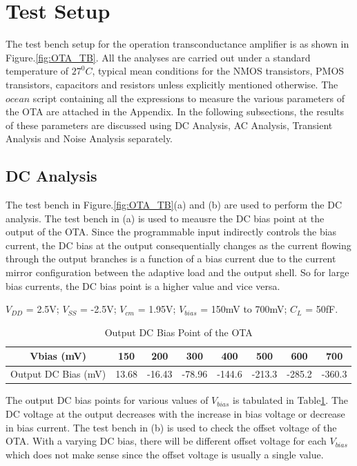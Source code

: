 \section{Test Setup}
The test bench setup for the operation transconductance amplifier is as shown in Figure.\ref{fig:OTA_TB}. All the analyses are carried out under a standard temperature of $27^0C$, typical mean conditions for the NMOS transistors, PMOS transistors, capacitors and resistors unless explicitly mentioned otherwise. The $ocean$ script containing all the expressions to measure the various parameters of the OTA are attached in the Appendix. In the following subsections, the results of these parameters are discussed using DC Analysis, AC Analysis, Transient Analysis and Noise Analysis separately.

\subsection{DC Analysis}
The test bench in Figure.\ref{fig:OTA_TB}(a) and (b) are used to perform the DC analysis. The test bench in (a) is used to meausre the DC bias point at the output of the OTA. Since the programmable input indirectly controls the bias current, the DC bias at the output consequentially changes as the current flowing through the output branches is a function of a bias current due to the current mirror configuration between the adaptive load and the output shell. So for large bias currents, the DC bias point is a higher value and vice versa.
 
$V_{DD}$ = 2.5V; $V_{SS}$ = -2.5V; $V_{cm}$ = 1.95V; $V_{bias}$ = 150mV to 700mV;   $C_{L}$ = 50fF.

\begin{table} [H]
\centering
\begin{tabular}{@{}cccccccc@{}}
\toprule
Vbias (mV)					& 150		& 200			& 300			& 400			& 500			& 600			& 700 \\ \midrule
Output DC Bias (mV)			& 13.68		& -16.43		& -78.96		& -144.6		& -213.3		& -285.2		& -360.3 \\
\bottomrule
\end{tabular}
\caption{Output DC Bias Point of the OTA}
\label{tab:OTA_DC_Bias}
\end{table}

The output DC bias points for various values of $V_{bias}$ is tabulated in Table\ref{tab:OTA_DC_Bias}. The DC voltage at the output decreases with the increase in bias voltage or decrease in bias current. The test bench in (b) is used to check the offset voltage of the OTA. With a varying DC bias, there will be different offset voltage for each $V_{bias}$ which does not make sense since the offset voltage is usually a single value.


